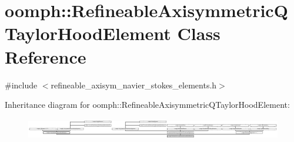 \hypertarget{classoomph_1_1RefineableAxisymmetricQTaylorHoodElement}{}\section{oomph\+:\+:Refineable\+Axisymmetric\+Q\+Taylor\+Hood\+Element Class Reference}
\label{classoomph_1_1RefineableAxisymmetricQTaylorHoodElement}


{\ttfamily \#include $<$refineable\+\_\+axisym\+\_\+navier\+\_\+stokes\+\_\+elements.\+h$>$}

Inheritance diagram for oomph\+:\+:Refineable\+Axisymmetric\+Q\+Taylor\+Hood\+Element\+:\begin{figure}[H]
\begin{center}
\leavevmode
\includegraphics[height=0.928690cm]{classoomph_1_1RefineableAxisymmetricQTaylorHoodElement}
\end{center}
\end{figure}
